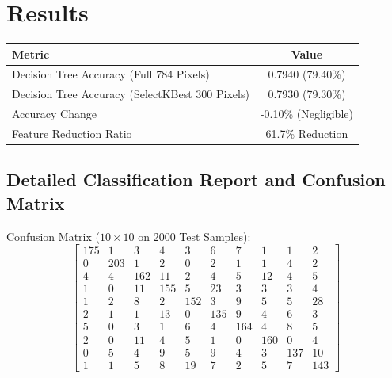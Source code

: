 \documentclass[12pt,a4paper]{article}
\begin{document}
\section{Results}

\begin{tabular}{lc}
\toprule
Metric & Value\\
\midrule
Decision Tree Accuracy (Full 784 Pixels) & 0.7940 (79.40\%) \\
Decision Tree Accuracy (SelectKBest 300 Pixels) & 0.7930 (79.30\%) \\
Accuracy Change & -0.10\% (Negligible) \\
Feature Reduction Ratio & 61.7\% Reduction \\
\bottomrule
\end{tabular}

\subsection*{Detailed Classification Report and Confusion Matrix}

Confusion Matrix ($10 \times 10$ on 2000 Test Samples):
\begin{equation*}
\begin{bmatrix}
175 & 1 & 3 & 4 & 3 & 6 & 7 & 1 & 1 & 2 \\
0 & 203 & 1 & 2 & 0 & 2 & 1 & 1 & 4 & 2 \\
4 & 4 & 162 & 11 & 2 & 4 & 5 & 12 & 4 & 5 \\
1 & 0 & 11 & 155 & 5 & 23 & 3 & 3 & 3 & 4 \\
1 & 2 & 8 & 2 & 152 & 3 & 9 & 5 & 5 & 28 \\
2 & 1 & 1 & 13 & 0 & 135 & 9 & 4 & 6 & 3 \\
5 & 0 & 3 & 1 & 6 & 4 & 164 & 4 & 8 & 5 \\
2 & 0 & 11 & 4 & 5 & 1 & 0 & 160 & 0 & 4 \\
0 & 5 & 4 & 9 & 5 & 9 & 4 & 3 & 137 & 10 \\
1 & 1 & 5 & 8 & 19 & 7 & 2 & 5 & 7 & 143
\end{bmatrix}
\end{equation*}
\end{document}
